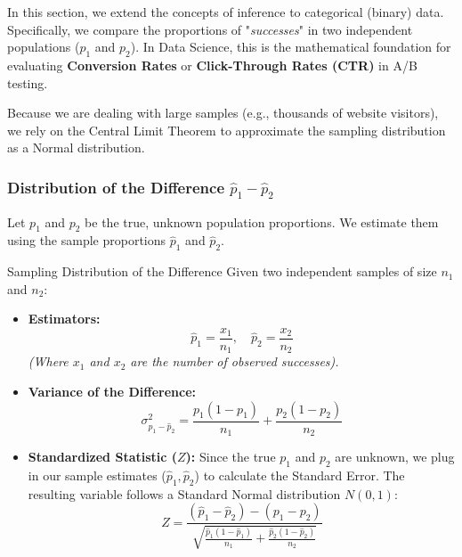 In this section, we extend the concepts of inference to categorical (binary) data. Specifically, we compare the proportions of "\textit{successes}" in two independent populations ($p_1$ and $p_2$). In Data Science, this is the mathematical foundation for evaluating \textbf{Conversion Rates} or \textbf{Click-Through Rates (CTR)} in A/B testing.

Because we are dealing with large samples (e.g., thousands of website visitors), we rely on the Central Limit Theorem to approximate the sampling distribution as a Normal distribution.

\subsubsection{Distribution of the Difference $\hat{p}_1 - \hat{p}_2$}

Let $p_1$ and $p_2$ be the true, unknown population proportions. We estimate them using the sample proportions $\hat{p}_1$ and $\hat{p}_2$. 

\begin{defbox}{Sampling Distribution of the Difference}
Given two independent samples of size $n_1$ and $n_2$:

\begin{itemize}
    \item \textbf{Estimators:}
    $$ \hat{p}_1 = \frac{x_1}{n_1}, \quad \hat{p}_2 = \frac{x_2}{n_2} $$
    \textit{(Where $x_1$ and $x_2$ are the number of observed successes).}

    \vs
    \item \textbf{Variance of the Difference:}
    \begin{equation}
        \sigma_{\hat{p}_{1}-\hat{p}_{2}}^{2} = \frac{p_{1}(1-p_{1})}{n_{1}} + \frac{p_{2}(1-p_{2})}{n_{2}}
    \end{equation}  

    \vs
    \item \textbf{Standardized Statistic ($Z$):}
    Since the true $p_1$ and $p_2$ are unknown, we plug in our sample estimates ($\hat{p}_1, \hat{p}_2$) to calculate the Standard Error. The resulting variable follows a Standard Normal distribution $N(0,1)$:
    \begin{equation}
        Z = \frac{(\hat{p}_{1}-\hat{p}_{2})-(p_{1}-p_{2})}{\sqrt{\frac{\hat{p}_{1}(1-\hat{p}_{1})}{n_{1}}+\frac{\hat{p}_{2}(1-\hat{p}_{2})}{n_{2}}}} 
    \end{equation} 
\end{itemize}
\end{defbox}

